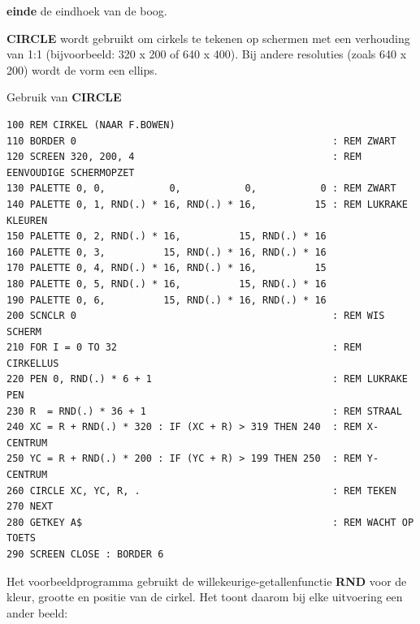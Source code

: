 \begin{description}[leftmargin=2cm,style=nextline]
                 {\bf einde} de eindhoek van de boog.

\item [Opmerkingen:] {\bf CIRCLE} wordt gebruikt om cirkels te tekenen op schermen met een verhouding van 1:1 (bijvoorbeeld: 320 x 200 of 640 x 400). Bij andere resoluties (zoals 640 x 200) wordt de vorm een ellips.

\item [Voorbeeld:] Gebruik van {\bf CIRCLE}

\begin{tcolorbox}[colback=black,coltext=white]
\verbatimfont{\codefont}
\begin{verbatim}
100 REM CIRKEL (NAAR F.BOWEN)
110 BORDER 0                                            : REM ZWART
120 SCREEN 320, 200, 4                                  : REM EENVOUDIGE SCHERMOPZET
130 PALETTE 0, 0,           0,           0,           0 : REM ZWART
140 PALETTE 0, 1, RND(.) * 16, RND(.) * 16,          15 : REM LUKRAKE KLEUREN
150 PALETTE 0, 2, RND(.) * 16,          15, RND(.) * 16
160 PALETTE 0, 3,          15, RND(.) * 16, RND(.) * 16
170 PALETTE 0, 4, RND(.) * 16, RND(.) * 16,          15
180 PALETTE 0, 5, RND(.) * 16,          15, RND(.) * 16
190 PALETTE 0, 6,          15, RND(.) * 16, RND(.) * 16
200 SCNCLR 0                                            : REM WIS SCHERM
210 FOR I = 0 TO 32                                     : REM CIRKELLUS
220 PEN 0, RND(.) * 6 + 1                               : REM LUKRAKE PEN
230 R  = RND(.) * 36 + 1                                : REM STRAAL
240 XC = R + RND(.) * 320 : IF (XC + R) > 319 THEN 240  : REM X-CENTRUM
250 YC = R + RND(.) * 200 : IF (YC + R) > 199 THEN 250  : REM Y-CENTRUM
260 CIRCLE XC, YC, R, .                                 : REM TEKEN
270 NEXT
280 GETKEY A$                                           : REM WACHT OP TOETS
290 SCREEN CLOSE : BORDER 6
\end{verbatim}
\end{tcolorbox}

                 Het voorbeeldprogramma gebruikt de willekeurige-getallenfunctie {\bf RND} voor de kleur, grootte en positie van de cirkel. Het toont daarom bij elke uitvoering een ander beeld:


\end{description}


\newpage

